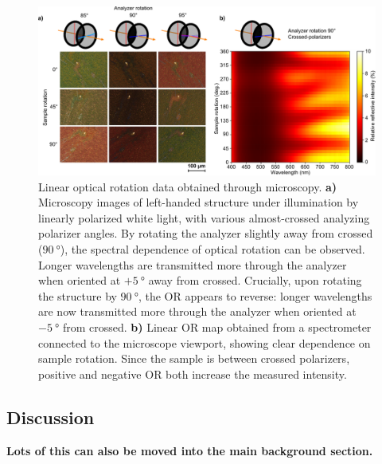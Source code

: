 \begin{figure}[htb!]	
    \centering	
    \includegraphics[scale=0.8]{./figures/results/OAinPlanarNanohelices/lin_data.pdf}

    \caption{\label{fig:results:OAinPlanarNanohelices:lin_data}
    Linear optical rotation data obtained through microscopy. \textbf{a)} Microscopy images of left-handed structure under illumination by linearly polarized white light, with various almost-crossed analyzing polarizer angles. By rotating the analyzer slightly away from crossed ($\SI{90}{\degree}$), the spectral dependence of optical rotation can be observed. Longer wavelengths are transmitted more through the analyzer when oriented at $+\SI{5}{\degree}$ away from crossed. Crucially, upon rotating the structure by $\SI{90}{\degree}$, the OR appears to reverse: longer wavelengths are now transmitted more through the analyzer when oriented at $-\SI{5}{\degree}$ from crossed. \textbf{b)} Linear OR map obtained from a spectrometer connected to the microscope viewport, showing clear dependence on sample rotation. Since the sample is between crossed polarizers, positive and negative OR both increase the measured intensity.}
\end{figure}

\subsection{Discussion}\label{sec:results:OAinPlanarNanohelices:discussion}
\textbf{Lots of this can also be moved into the main background section.}

